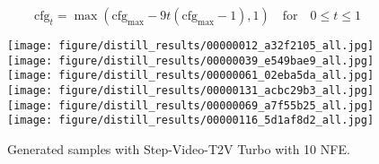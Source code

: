 \begin{equation}
\text{cfg}_t = \max(\text{cfg}_{\max} - 9t (\text{cfg}_{\max} - 1), 1) \quad \text{for} \quad 0 \leq t \leq 1
\label{eq:cfg}
\end{equation}

\begin{figure}[ht]
    \centering
    \texttt{[image: figure/distill\_results/00000012\_a32f2105\_all.jpg]}
    \texttt{[image: figure/distill\_results/00000039\_e549bae9\_all.jpg]}
    \texttt{[image: figure/distill\_results/00000061\_02eba5da\_all.jpg]}
    \texttt{[image: figure/distill\_results/00000131\_acbc29b3\_all.jpg]}
    \texttt{[image: figure/distill\_results/00000069\_a7f55b25\_all.jpg]}
    \texttt{[image: figure/distill\_results/00000116\_5d1af8d2\_all.jpg]}
    \caption{Generated samples with Step-Video-T2V Turbo with 10 NFE.}
    \label{fig:distillation_result}
\end{figure}